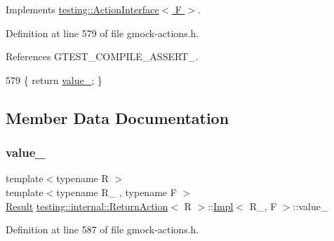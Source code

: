 Implements \hyperlink{classtesting_1_1ActionInterface_a20f8624fcea1786f2992b358760422a0}{testing\+::\+Action\+Interface$<$ F $>$}.



Definition at line 579 of file gmock-\/actions.\+h.



References G\+T\+E\+S\+T\+\_\+\+C\+O\+M\+P\+I\+L\+E\+\_\+\+A\+S\+S\+E\+R\+T\+\_\+.


\begin{DoxyCode}
579 \{ \textcolor{keywordflow}{return} \hyperlink{classtesting_1_1internal_1_1ReturnAction_1_1Impl_a75916c30e7f8bb0388f3313788f25fa5}{value\_}; \}
\end{DoxyCode}


\subsection{Member Data Documentation}
\mbox{\label{classtesting_1_1internal_1_1ReturnAction_1_1Impl_a75916c30e7f8bb0388f3313788f25fa5}} 
\subsubsection{\texorpdfstring{value\+\_\+}{value\_}}
{\footnotesize\ttfamily template$<$typename R $>$ \\
template$<$typename R\+\_\+ , typename F $>$ \\
\hyperlink{classtesting_1_1internal_1_1ReturnAction_1_1Impl_a681fdf18258f86ea31efe0c55217e571}{Result} \hyperlink{classtesting_1_1internal_1_1ReturnAction}{testing\+::internal\+::\+Return\+Action}$<$ R $>$\+::\hyperlink{classtesting_1_1internal_1_1ReturnAction_1_1Impl}{Impl}$<$ R\+\_\+, F $>$\+::value\+\_\+\hspace{0.3cm}{\ttfamily [private]}}



Definition at line 587 of file gmock-\/actions.\+h.

\mbox{\label{classtesting_1_1internal_1_1ReturnAction_1_1Impl_a0dbd2f08128302c1395063f84f661366}} 
